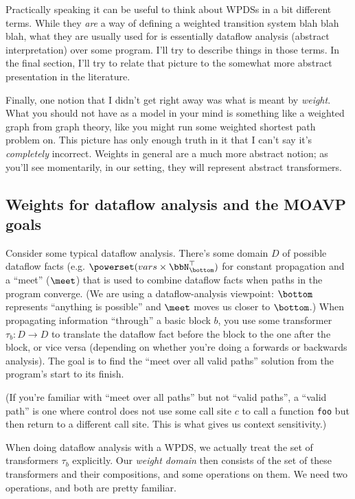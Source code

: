 \documentclass{article}
\newcommand{\code}[1]{\texttt{#1}}
\begin{document}
\begin{defintion}
Practically speaking it can be useful to think about WPDSs in a bit
different terms. While they \emph{are} a way of defining a weighted
transition system blah blah blah, what they are usually used for is
essentially dataflow analysis (abstract interpretation) over some
program. I'll try to describe things in those terms. In the final
section, I'll try to relate that picture to the somewhat more abstract
presentation in the literature.

Finally, one notion that I didn't get right away was what is meant by
\emph{weight}. What you should not have as a model in your mind is
something like a weighted graph from graph theory, like you might run
some weighted shortest path problem on. This picture has only enough
truth in it that I can't say it's \emph{completely} incorrect. Weights
in general are a much more abstract notion; as you'll see momentarily,
in our setting, they will represent abstract transformers.

\subsection{Weights for dataflow analysis and the MOAVP goals}

Consider some typical dataflow analysis. There's some domain $D$ of
possible dataflow facts (e.g. $\powerset(vars \times
\bbN_\bottom^\top)$ for constant propagation and a ``meet'' ($\meet$)
that is used to combine dataflow facts when paths in the program
converge. (We are using a dataflow-analysis viewpoint: $\bottom$
represents ``anything is possible'' and $\meet$ moves us closer to
$\bottom$.) When propagating information ``through'' a basic block
$b$, you use some transformer $\tau_b: D \rightarrow D$ to translate
the dataflow fact before the block to the one after the block, or vice
versa (depending on whether you're doing a forwards or backwards
analysis). The goal is to find the ``meet over all valid paths''
solution from the program's start to its finish.

(If you're familiar with ``meet over all paths'' but not ``valid
paths'', a ``valid path'' is one where control does not use some call
site $c$ to call a function \code{foo} but then return to a different
call site. This is what gives us context sensitivity.)

When doing dataflow analysis with a WPDS, we actually treat the set of
transformers $\tau_b$ explicitly. Our \emph{weight domain} then
consists of the set of these transformers and their compositions, and
some operations on them. We need two operations, and both are pretty
familiar.


\end{defintion}
\end{document}
